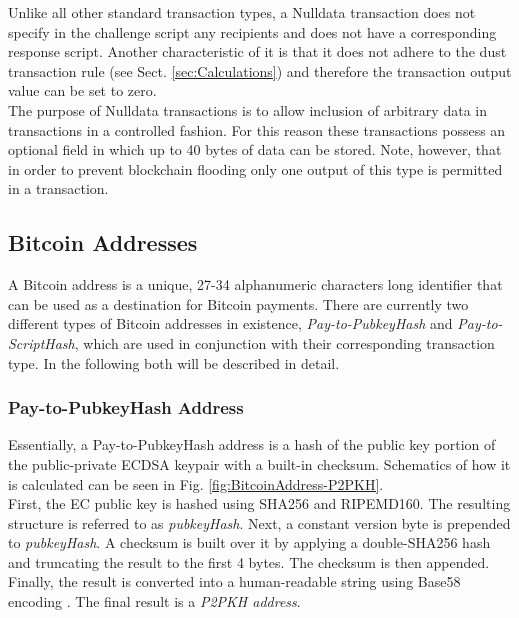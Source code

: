 \noindent
Unlike all other standard transaction types, a Nulldata transaction does not specify in the challenge script any recipients and does not have a corresponding response script. Another characteristic of it is that it does not adhere to the dust transaction rule (see Sect. \ref{sec:Calculations}) and therefore the transaction output value can be set to zero.~\\

\noindent
The purpose of Nulldata transactions is to allow inclusion of arbitrary data in transactions in a controlled fashion. For this reason these transactions possess an optional field in which up to 40 bytes of data can be stored. Note, however, that in order to prevent blockchain flooding only one output of this type is permitted in a transaction.


\clearpage
\subsection{Bitcoin Addresses} \label{sec:BitcoinAddresses}
A Bitcoin address is a unique, 27-34 alphanumeric characters long identifier that can be used as a destination for Bitcoin payments. There are currently two different types of Bitcoin addresses in existence, \emph{Pay-to-PubkeyHash} and \emph{Pay-to-ScriptHash}, which are used in conjunction with their corresponding transaction type. In the following both will be described in detail.

\subsubsection{Pay-to-PubkeyHash Address} \label{sec:Address-P2PKH}
Essentially, a Pay-to-PubkeyHash address is a hash of the public key portion of the public-private ECDSA keypair with a built-in checksum. Schematics of how it is calculated can be seen in Fig. \ref{fig:BitcoinAddress-P2PKH}.~\\

\noindent
First, the EC public key is hashed using SHA256 and RIPEMD160. The resulting structure is referred to as \textit{pubkeyHash}. Next, a constant version byte is prepended to \textit{pubkeyHash}. A checksum is built over it by applying a double-SHA256 hash and truncating the result to the first 4 bytes. The checksum is then appended. Finally, the result is converted into a human-readable string using Base58 encoding \cite{Base58}. The final result is a \emph{P2PKH address}.

